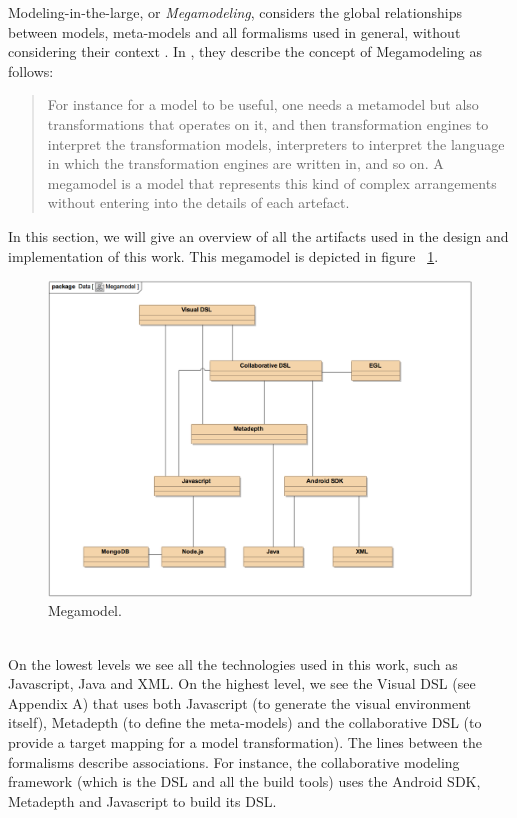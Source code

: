 Modeling-in-the-large, or \textit{Megamodeling}, considers the global relationships between models, meta-models and all formalisms used in general, without considering their context \cite{Megamodeling}. In \cite{Megamodeling}, they describe the concept of Megamodeling as follows:
\begin{quotation}
For instance for a model to be useful, one needs a metamodel but also transformations that operates on it, and then transformation engines to interpret the transformation models, interpreters to interpret the language in which the transformation engines are written in, and so on. A megamodel is a model that represents this kind of complex arrangements without entering into the details of each artefact.
\end{quotation}
In this section, we will give an overview of all the artifacts used in the design and implementation of this work. This megamodel is depicted in figure ~\ref{fig:megamodel}.
\begin{figure}[h!]
\centering
\includegraphics[width=1.02\textwidth]{images/chap6_megamodel.png}
\caption{Megamodel.}
\label{fig:megamodel}
\end{figure} \\
On the lowest levels we see all the technologies used in this work, such as Javascript, Java and XML.  On the highest level, we see the Visual DSL (see Appendix A) that uses both Javascript (to generate the visual environment itself), Metadepth (to define the meta-models) and the collaborative DSL (to provide a target mapping for a model transformation). The lines between the formalisms describe associations. For instance, the collaborative modeling framework (which is the DSL and all the build tools) uses the Android SDK, Metadepth and Javascript to build its DSL.

